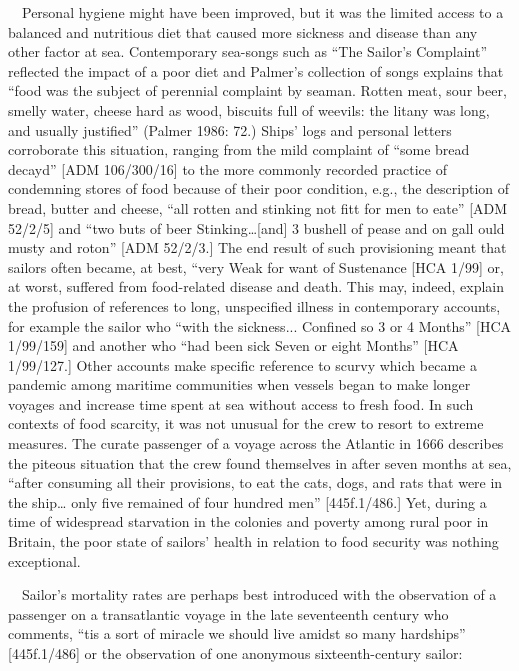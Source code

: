 \begin{styleStandard}
\ \ Personal hygiene might have been improved, but it was the limited access to a balanced and nutritious diet that caused more sickness and disease than any other factor at sea. Contemporary sea-songs such as “The Sailor’s Complaint” reflected the impact of a poor diet and Palmer’s collection of songs explains that “food was the subject of perennial complaint by seaman. Rotten meat, sour beer, smelly water, cheese hard as wood, biscuits full of weevils: the litany was long, and usually justified” (Palmer 1986: 72.) Ships’ logs and personal letters corroborate this situation, ranging from the mild complaint of “some bread decay{\textquotesingle}d” [ADM 106/300/16] to the more commonly recorded practice of condemning stores of food because of their poor condition, e.g., the description of bread, butter and cheese, “all rotten and stinking not fitt for men to eate” [ADM 52/2/5] and “two buts of beer Stinking…[and] 3 bushell of pease and on gall ould musty and roton” [ADM 52/2/3.] The end result of such provisioning meant that sailors often became, at best, “very Weak for want of Sustenance{\textquotedbl} [HCA 1/99] or, at worst, suffered from food-related disease and death. This may, indeed, explain the profusion of references to long, unspecified illness in contemporary accounts, for example the sailor who “with the sickness... Confined so 3 or 4 Months” [HCA 1/99/159] and another who “had been sick Seven or eight Months” [HCA 1/99/127.] Other accounts make specific reference to scurvy which became a pandemic among maritime communities when vessels began to make longer voyages and increase time spent at sea without access to fresh food. In such contexts of food scarcity, it was not unusual for the crew to resort to extreme measures. The curate passenger of a voyage across the Atlantic in 1666 describes the piteous situation that the crew found themselves in after seven months at sea, “after consuming all their provisions, to eat the cats, dogs, and rats that were in the ship… only five remained of four hundred men” [445f.1/486.] Yet, during a time of widespread starvation in the colonies and poverty among rural poor in Britain, the poor state of sailors’ health in relation to food security was nothing exceptional. 
\end{styleStandard}


\begin{styleStandard}
\ \ Sailor’s mortality rates are perhaps best introduced with the observation of a passenger on a transatlantic voyage in the late seventeenth century who comments, “tis a sort of miracle we should live amidst so many hardships” [445f.1/486] or the observation of one anonymous sixteenth-century sailor:
\end{styleStandard}


